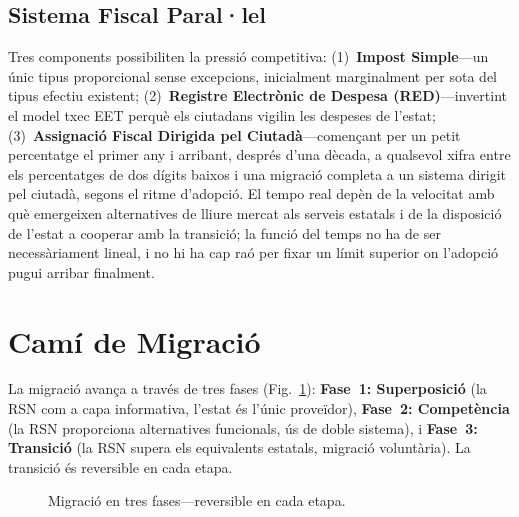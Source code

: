 \documentclass[11pt,a4paper,twocolumn]{article}
\begin{document}
\subsection{Sistema Fiscal Paral·lel}

Tres components possibiliten la pressió competitiva: (1)~\textbf{Impost Simple}---un únic tipus proporcional sense excepcions, inicialment marginalment per sota del tipus efectiu existent; (2)~\textbf{Registre Electrònic de Despesa (RED)}---invertint el model txec EET perquè els ciutadans vigilin les despeses de l'estat; (3)~\textbf{Assignació Fiscal Dirigida pel Ciutadà}---començant per un petit percentatge el primer any i arribant, després d'una dècada, a qualsevol xifra entre els percentatges de dos dígits baixos i una migració completa a un sistema dirigit pel ciutadà, segons el ritme d'adopció. El tempo real depèn de la velocitat amb què emergeixen alternatives de lliure mercat als serveis estatals i de la disposició de l'estat a cooperar amb la transició; la funció del temps no ha de ser necessàriament lineal, i no hi ha cap raó per fixar un límit superior on l'adopció pugui arribar finalment.

\section{Camí de Migració}

La migració avança a través de tres fases (Fig.~\ref{fig:migration}): \textbf{Fase~1: Superposició} (la RSN com a capa informativa, l'estat és l'únic proveïdor), \textbf{Fase~2: Competència} (la RSN proporciona alternatives funcionals, ús de doble sistema), i \textbf{Fase~3: Transició} (la RSN supera els equivalents estatals, migració voluntària). La transició és reversible en cada etapa.

\begin{figure}[ht]
\centering
{}
\caption{Migració en tres fases---reversible en cada etapa.}
\label{fig:migration}
\end{figure}
\end{document}
